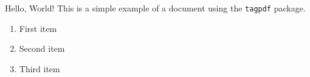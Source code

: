 \documentclass{llncs}
\begin{document}





          Hello, World!
        \tagmcend
      \tagstructend
      This is a simple example of a document using the \texttt{tagpdf} package.
    \tagstructend
  \tagstructend
\tagstructend

\begin{enumerate}
  \item First item
  \item Second item
  \item Third item
\end{enumerate}


\end{document}
